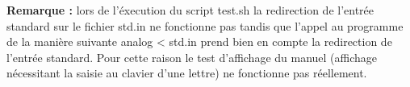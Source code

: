 \documentclass[a4paper]{article}
\begin{document}
\begin{appendix}
\begin{tabular}{|l|c|m{10cm}|}
\end{tabular}
\bigskip
\vspace*{\fill}

\noindent
\textbf{Remarque :} lors de l'éxecution du script test.sh la redirection de l'entrée standard sur le fichier std.in ne fonctionne pas tandis que l'appel au programme de la manière suivante analog < std.in prend bien en compte la redirection de l'entrée standard. Pour cette raison le test d'affichage du manuel (affichage nécessitant la saisie au clavier d'une lettre) ne fonctionne pas réellement.
\vspace*{\fill}

\end{appendix}
\end{document}

